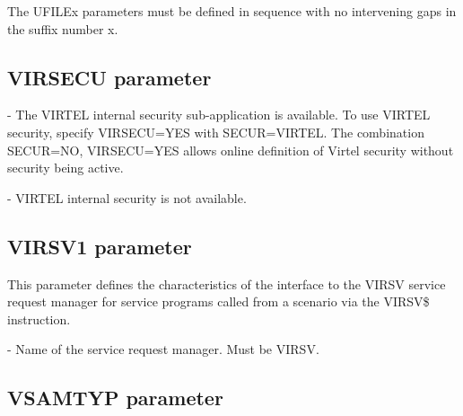 \documentclass[letterpaper,10pt,english]{sphinxmanual}
\begin{document}
The UFILEx parameters must be defined in sequence with no intervening gaps in the suffix number x.


\subsection{VIRSECU parameter}
\label{\detokenize{Installation_Guide:virsecu-parameter}}\label{\detokenize{Installation_Guide:index-134}}
\begin{sphinxVerbatim}[commandchars=\\\{\}]
 
\end{sphinxVerbatim}

 - The VIRTEL internal security sub-application is available. To use VIRTEL security, specify VIRSECU=YES with SECUR=VIRTEL. The combination SECUR=NO, VIRSECU=YES allows online definition of Virtel security without security being active.

 - VIRTEL internal security is not available.


\subsection{VIRSV1 parameter}
\label{\detokenize{Installation_Guide:index-135}}\label{\detokenize{Installation_Guide:virsv1-parameter}}
\begin{sphinxVerbatim}[commandchars=\\\{\}]
 
\end{sphinxVerbatim}

This parameter defines the characteristics of the interface to the VIRSV service request manager for service programs called from a scenario via the VIRSV\$ instruction.

 - Name of the service request manager. Must be VIRSV.


\subsection{VSAMTYP parameter}
\label{\detokenize{Installation_Guide:index-136}}\label{\detokenize{Installation_Guide:vsamtyp-parameter}}
\begin{sphinxVerbatim}[commandchars=\\\{\}]
 
\end{sphinxVerbatim}
\end{document}
